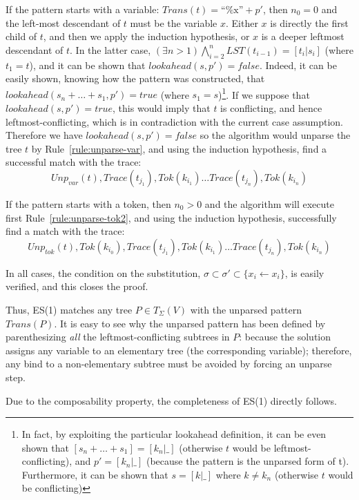 \documentclass{sigplanconf}
\begin{document}
If the pattern starts with a variable: $Trans(t) = \mbox{``\%x''}+p'$,
then $n_0=0$ and the left-most descendant of $t$ must be the variable
$x$. Either $x$ is directly the first child of $t$, and then we apply
the induction hypothesis, or $x$ is a deeper leftmost descendant of
$t$. In the latter case, $(\exists n>1) \bigwedge_{i=2}^{n}
LST(t_{i-1}) = [t_i | s_i]$ (where $t_1 = t$), and it can be shown
that $lookahead(s, p') = false$. Indeed, it can be easily shown,
knowing how the pattern was constructed, that
$lookahead(s_n+\dots+s_1, p') = true$ (where $s_1=s$)\footnote{In
fact, by exploiting the particular lookahead definition, it can be
even shown that $[s_n+\dots+s_1] = [k_n|\_]$ (otherwise $t$ would be
leftmost-conflicting), and $p'=[k_n|\_]$ (because the pattern is the
unparsed form of t). Furthermore, it can be shown that $s = [k|\_]$
where $k\not=k_n$ (otherwise $t$ would be conflicting)}.  If we
suppose that $lookahead(s, p') = true$, this would imply that $t$ is
conflicting, and hence leftmost-conflicting, which is in contradiction
with the current case assumption. Therefore we have $lookahead(s, p')
= false$ so the algorithm would unparse the tree $t$ by
Rule~\ref{rule:unparse-var}, and using the induction hypothesis, find
a successful match with the trace:
\[Unp_{var}(t), Trace(t_{j_1}), Tok(k_{i_1}) \dots Trace(t_{j_n}),
Tok(k_{i_n})
\]

If the pattern starts with a token, then $n_0>0$ and the algorithm
will execute first Rule~\ref{rule:unparse-tok2}, and using the
induction hypothesis, successfully find a match with the trace:
\[Unp_{tok}(t),
Tok(k_{i_0}), Trace(t_{j_1}), Tok(k_{i_1}) \dots Trace(t_{j_n}),
Tok(k_{i_n})\]

In all cases, the condition on the substitution,
$\sigma\subset\sigma'\subset\{x_i \gets x_i\}$, is easily verified,
and this closes the proof.

Thus, ES(1) matches any tree $P \in T_\Sigma(V)$ with the unparsed
pattern $Trans(P)$. It is easy to see why the unparsed pattern has
been defined by parenthesizing {\em all} the leftmost-conflicting
subtrees in $P$: because the solution assigns any variable to an
elementary tree (the corresponding variable); therefore, any bind to a
non-elementary subtree must be avoided by forcing an unparse step.

Due to the composability property, the completeness of ES(1) directly
follows.
\end{document}
